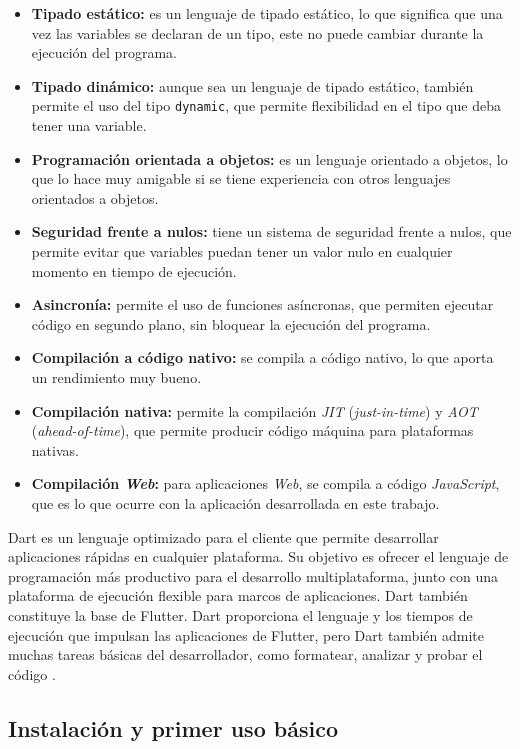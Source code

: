 \begin{itemize}
  \item \textbf{Tipado estático:} es un lenguaje de tipado estático, lo que significa que una vez las 
  variables se declaran de un tipo, este no puede cambiar durante la ejecución del programa.
  \item \textbf{Tipado dinámico:} aunque sea un lenguaje de tipado estático, también permite el uso del tipo
  \texttt{dynamic}, que permite flexibilidad en el tipo que deba tener una variable.
  \item \textbf{Programación orientada a objetos:} es un lenguaje orientado a objetos, lo que lo hace muy amigable
  si se tiene experiencia con otros lenguajes orientados a objetos.
  \item \textbf{Seguridad frente a nulos:} tiene un sistema de seguridad frente a nulos, que permite evitar que variables
puedan tener un valor nulo en cualquier momento en tiempo de ejecución.
  \item \textbf{Asincronía:} permite el uso de funciones asíncronas, que permiten ejecutar código en segundo plano, 
  sin bloquear la ejecución del programa.
  \item \textbf{Compilación a código nativo:} se compila a código nativo, lo que aporta un rendimiento muy bueno.
  \item \textbf{Compilación nativa:} permite la compilación \textit{JIT} (\textit{just-in-time}) y \textit{AOT} (\textit{ahead-of-time}), 
  que permite producir código máquina para plataformas nativas.
  \item \textbf{Compilación \textit{Web}:} para aplicaciones \textit{Web}, se compila a código
  \textit{JavaScript}, que es lo que ocurre con la aplicación desarrollada en este trabajo.
\end{itemize}

Dart es un lenguaje optimizado para el cliente que permite desarrollar aplicaciones rápidas en cualquier 
plataforma. Su objetivo es ofrecer el lenguaje de programación más productivo para el desarrollo 
multiplataforma, junto con una plataforma de ejecución flexible para marcos de aplicaciones. 
Dart también constituye la base de Flutter. Dart proporciona el lenguaje y los tiempos de ejecución 
que impulsan las aplicaciones de Flutter, pero Dart también admite muchas tareas básicas del desarrollador, 
como formatear, analizar y probar el código \cite{dart_overview}.

\subsection{Instalación y primer uso básico\label{SEC:INSTALACION}}

